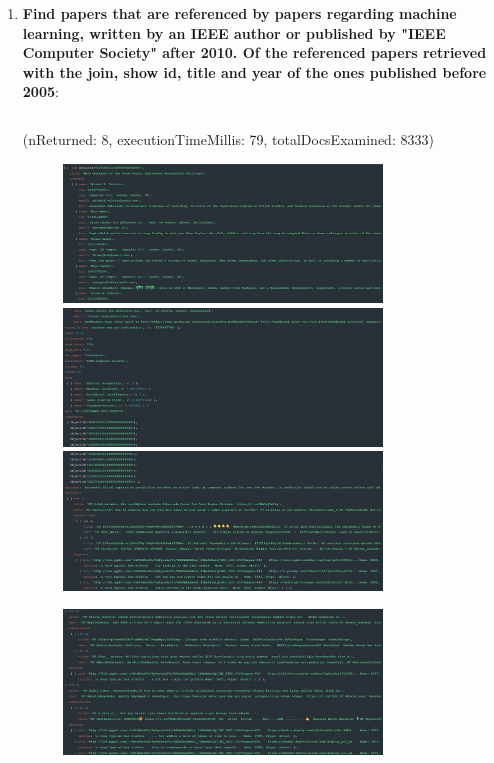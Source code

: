 \documentclass{Configuration_Files/PoliMi3i_thesis}
\begin{document}
\begin{enumerate}
    \item \textbf{Find papers that are referenced by papers regarding machine learning, written by an IEEE author or published by "IEEE Computer Society" after 2010. Of the referenced papers retrieved with the join, show id, title and year of the ones published before 2005}:
    \inputminted[linenos,tabsize=2,breaklines]{MQL}{code/queries_mongodb/query_11.txt}
    (nReturned: 8, executionTimeMillis: 79, totalDocsExamined: 8333)
    \begin{figure}[H]
        \centering
        \includegraphics[width=0.8\textwidth]{Images/queries_mongodb/query_11_1.jpg}
        \includegraphics[width=0.8\textwidth]{Images/queries_mongodb/query_11_2.jpg}
        \includegraphics[width=0.8\textwidth]{Images/queries_mongodb/query_11_3.jpg}
    \end{figure}
    \begin{figure}[H]
        \centering
        \includegraphics[width=0.8\textwidth]{Images/queries_mongodb/query_11_4.jpg}

\end{figure}
\end{enumerate}
\end{document}
